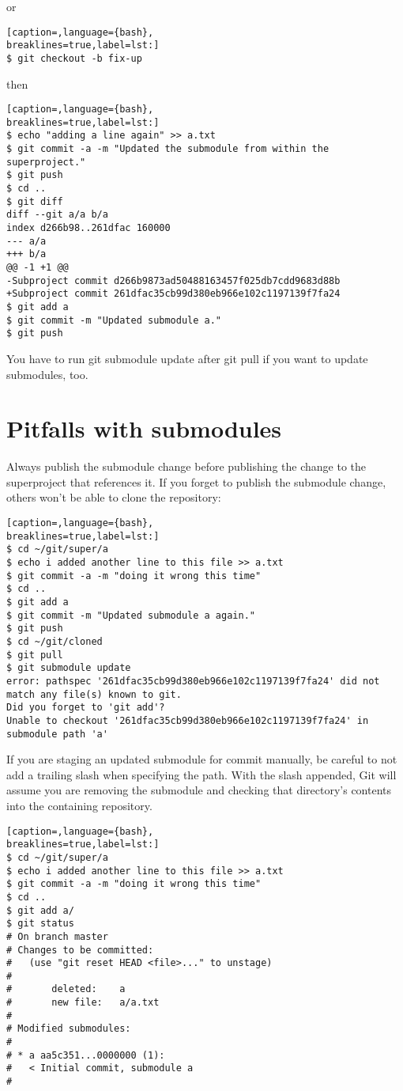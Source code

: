 or
\lstset{basicstyle=\scriptsize, numbers=none, captionpos=b, tabsize=4}
\begin{lstlisting}[caption=,language={bash},
breaklines=true,label=lst:]
$ git checkout -b fix-up
\end{lstlisting}

then
\lstset{basicstyle=\scriptsize, numbers=none, captionpos=b, tabsize=4}
\begin{lstlisting}[caption=,language={bash},
breaklines=true,label=lst:]
$ echo "adding a line again" >> a.txt
$ git commit -a -m "Updated the submodule from within the superproject."
$ git push
$ cd ..
$ git diff
diff --git a/a b/a
index d266b98..261dfac 160000
--- a/a
+++ b/a
@@ -1 +1 @@
-Subproject commit d266b9873ad50488163457f025db7cdd9683d88b
+Subproject commit 261dfac35cb99d380eb966e102c1197139f7fa24
$ git add a
$ git commit -m "Updated submodule a."
$ git push
\end{lstlisting}

You have to run git submodule update after git pull if you want to update
submodules, too.

\section{Pitfalls with submodules}
Always publish the submodule change before publishing the change to the
superproject that references it. If you forget to publish the submodule change,
others won't be able to clone the repository:
\lstset{basicstyle=\scriptsize, numbers=none, captionpos=b, tabsize=4}
\begin{lstlisting}[caption=,language={bash},
breaklines=true,label=lst:]
$ cd ~/git/super/a
$ echo i added another line to this file >> a.txt
$ git commit -a -m "doing it wrong this time"
$ cd ..
$ git add a
$ git commit -m "Updated submodule a again."
$ git push
$ cd ~/git/cloned
$ git pull
$ git submodule update
error: pathspec '261dfac35cb99d380eb966e102c1197139f7fa24' did not match any file(s) known to git.
Did you forget to 'git add'?
Unable to checkout '261dfac35cb99d380eb966e102c1197139f7fa24' in submodule path 'a'
\end{lstlisting}

If you are staging an updated submodule for commit manually, be careful to not
add a trailing slash when specifying the path. With the slash appended, Git
will assume you are removing the submodule and checking that directory's
contents into the containing repository.
\lstset{basicstyle=\scriptsize, numbers=none, captionpos=b, tabsize=4}
\begin{lstlisting}[caption=,language={bash},
breaklines=true,label=lst:]
$ cd ~/git/super/a
$ echo i added another line to this file >> a.txt
$ git commit -a -m "doing it wrong this time"
$ cd ..
$ git add a/
$ git status
# On branch master
# Changes to be committed:
#   (use "git reset HEAD <file>..." to unstage)
#
#       deleted:    a
#       new file:   a/a.txt
#
# Modified submodules:
#
# * a aa5c351...0000000 (1):
#   < Initial commit, submodule a
#
\end{lstlisting}

